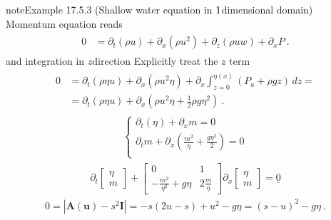 \documentclass[letterpaper,10pt,english]{jupyterBook}
\begin{document}
\begin{sphinxadmonition}{note}{Example 17.5.3 (Shallow water equation in \protect\(1\protect\)\sphinxhyphen{}dimensional domain)}
\sphinxAtStartPar
Momentum equation reads
\begin{equation*}
\begin{split}\begin{aligned}
  0
  & = \partial_t (\rho u) + \partial_x (\rho u^2) + \partial_z (\rho u w) + \partial_x P \ .
\end{aligned}\end{split}
\end{equation*}
\sphinxAtStartPar
and integration in \(z\)\sphinxhyphen{}direction  Explicitly treat the \(z\) term
\begin{equation*}
\begin{split}\begin{aligned}
  0
  & = \partial_t (\rho \eta u) + \partial_x (\rho u^2 \eta) + \partial_x \int_{z=0}^{\eta(x)} (P_a + \rho g z) \, dz = \\
  & = \partial_t (\rho \eta u) + \partial_x \left(\rho u^2 \eta + \frac{1}{2} \rho g \eta^2 \right)  \ .
\end{aligned}\end{split}
\end{equation*}
\sphinxAtStartPar
{}
\begin{equation*}
\begin{split}\begin{cases}
  \partial_t (\eta) + \partial_x m = 0 \\
  \partial_t m + \partial_x \left( \frac{m^2}{\eta} + \frac{g \eta^2}{2} \right) = 0 \\
\end{cases}\end{split}
\end{equation*}
\sphinxAtStartPar
{}
\begin{equation*}
\begin{split}
  \partial_t \begin{bmatrix} \eta \\ m \end{bmatrix} + \begin{bmatrix} 0 & 1 \\ -\frac{m^2}{\eta^2}+g\eta & 2 \frac{m}{\eta} \end{bmatrix} \partial_x \begin{bmatrix} \eta \\ m \end{bmatrix} = \underline{0}
\end{split}
\end{equation*}
\sphinxAtStartPar
{}
\begin{equation*}
\begin{split}0 = |\mathbf{A}(\mathbf{u}) - s^2 \mathbf{I}| = -s \left( 2 u - s \right) + u^2 - g \eta = (s-u)^2 - g  \eta \ .\end{split}
\end{equation*}\end{sphinxadmonition}
\end{document}
